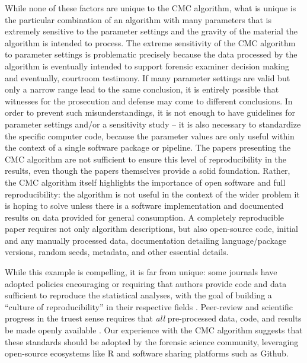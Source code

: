While none of these factors are unique to the CMC algorithm, what is
unique is the particular combination of an algorithm with many
parameters that is extremely sensitive to the parameter settings and the
gravity of the material the algorithm is intended to process. The
extreme sensitivity of the CMC algorithm to parameter settings is
problematic precisely because the data processed by the algorithm is
eventually intended to support forensic examiner decision making and
eventually, courtroom testimony. If many parameter settings are valid
but only a narrow range lead to the same conclusion, it is entirely
possible that witnesses for the prosecution and defense may come to
different conclusions. In order to prevent such misunderstandings, it is
not enough to have guidelines for parameter settings and/or a
sensitivity study -- it is also necessary to standardize the specific
computer code, because the parameter values are only useful within the
context of a single software package or pipeline. The papers presenting
the CMC algorithm are not sufficient to ensure this level of
reproducibility in the results, even though the papers themselves
provide a solid foundation. Rather, the CMC algorithm itself highlights
the importance of open software and full reproducibility: the algorithm
is not useful in the context of the wider problem it is hoping to solve
unless there is a software implementation and documented results on data
provided for general consumption. A completely reproducible paper
requires not only algorithm descriptions, but also open-source code,
initial and any manually processed data, documentation detailing
language/package versions, random seeds, metadata, and other essential
details.

While this example is compelling, it is far from unique: some journals
have adopted policies encouraging or requiring that authors provide code
and data sufficient to reproduce the statistical analyses, with the goal
of building a ``culture of reproducibility'' in their respective fields
\citep{peng_reproducible_2009, peng_reproducible_2011, stodden_toward_2013}.
Peer-review and scientific progress in the truest sense requires that
\emph{all} pre-processed data, code, and results be made openly
available \citep{kwongAlgorithmSaysYou2017, desaiTrustVerifyGuide2017}.
Our experience with the CMC algorithm suggests that these standards
should be adopted by the forensic science community, leveraging
open-source ecosystems like R and software sharing platforms such as
Github.

